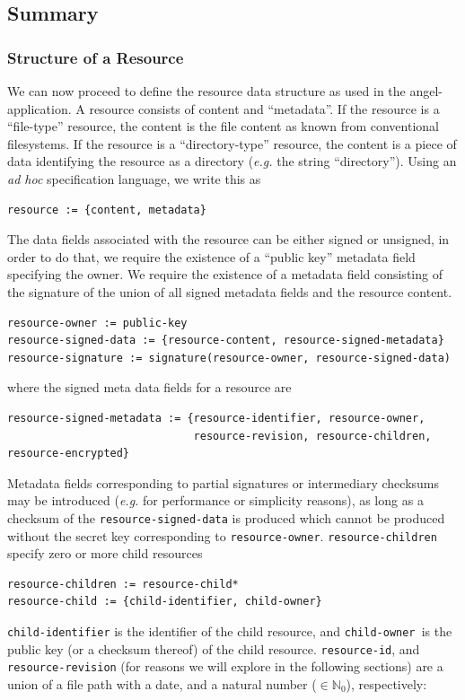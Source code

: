 \documentclass[11pt]{article}
\begin{document}
\begin{mainmatter}
\subsection{Summary}

\subsubsection{Structure of a Resource}
\label{resource-structure}
We can now proceed to define the resource data structure as used in the angel-application. A resource consists of content and ``metadata''. If the resource is a ``file-type'' resource, the content is the file content as known from conventional filesystems. If the resource is a ``directory-type'' resource, the content is a piece of data identifying the resource as a directory (\emph{e.g.} the string ``directory''). Using an \emph{ad hoc} specification language, we write this as
\begin{verbatim}
resource := {content, metadata}
\end{verbatim}
The data fields associated with the resource can be either signed or unsigned, in order to do that, we require the existence of a ``public key'' metadata field specifying the owner. We require the existence of a metadata field consisting of the signature of the union of all signed metadata fields and the resource content. 
\begin{verbatim}
resource-owner := public-key
resource-signed-data := {resource-content, resource-signed-metadata}
resource-signature := signature(resource-owner, resource-signed-data)
\end{verbatim}
where the signed meta data fields for a resource are
\begin{verbatim}
resource-signed-metadata := {resource-identifier, resource-owner, 
                             resource-revision, resource-children, resource-encrypted}
\end{verbatim} \label{revision}
Metadata fields corresponding to partial signatures or intermediary checksums may be introduced (\emph{e.g.} for performance or simplicity reasons), as long as a checksum of the \texttt{resource-signed-data} is produced which cannot be produced without the secret key corresponding to \texttt{resource-owner}.
\texttt{resource-children} specify zero or more child resources
\begin{verbatim}
resource-children := resource-child*
resource-child := {child-identifier, child-owner}
\end{verbatim}
\texttt{child-identifier} is the identifier of the child resource, and \texttt{child-owner }is the public key (or a checksum thereof) of the child resource. \texttt{resource-id}, and \texttt{resource-revision} (for reasons we will explore in the following sections) are a union of a file path with a date, and a natural number ($\in \mathbb N_0$), respectively:

\end{mainmatter}
\end{document}
